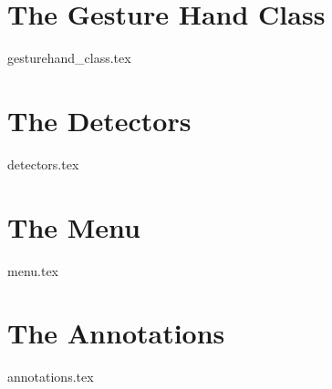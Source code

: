 \section{The Gesture Hand Class}
\label{sec:gesturehand_class}
{gesturehand_class.tex}
 

\section{The Detectors}
\label{sec:detectors}
{detectors.tex}


\section{The Menu}
\label{sec:menu}
{menu.tex}


\section{The Annotations}
\label{sec:annotations}
{annotations.tex}


